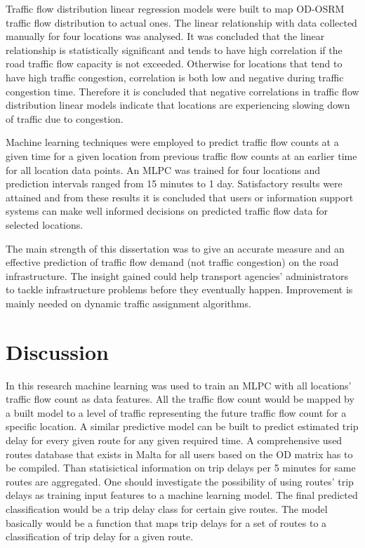 \documentclass[12pt, a4paper]{report}
\theoremstyle{definition}
\theoremstyle{definition}%
\theoremstyle{definition}%
\theoremstyle{definition}%
\theoremstyle{definition}%
\theoremstyle{definition}%
\begin{document}
Traffic flow distribution linear regression models were built to map OD-OSRM traffic flow distribution to actual ones. The linear relationship with data collected manually for four locations was analysed. It was concluded that the linear relationship is statistically significant and tends to have high correlation if the road traffic flow capacity is not exceeded. Otherwise for locations that tend to have high traffic congestion, correlation is both low and negative during traffic congestion time. Therefore it is concluded that negative correlations in traffic flow distribution linear models indicate that locations are experiencing slowing down of traffic due to congestion.

Machine learning techniques were employed to predict traffic flow counts at a given time for a given location from previous traffic flow counts at an earlier time for all location data points. An MLPC was trained for four locations and prediction intervals ranged from 15 minutes to 1 day. Satisfactory results were attained and from these results it is concluded that users or information support systems can make well informed decisions on predicted traffic flow data for selected locations.

The main strength of this dissertation was to give an accurate measure and an effective prediction of traffic flow demand (not traffic congestion) on the road infrastructure. The insight gained could help transport agencies' administrators to tackle infrastructure problems before they eventually happen. Improvement is mainly needed on dynamic traffic assignment algorithms.

\section{Discussion} \label{discussion}

In this research machine learning was used to train an MLPC with all locations' traffic flow count as data features. All the traffic flow count would be mapped by a built model to a level of traffic representing the future traffic flow count for a specific location. A similar predictive model can be built to predict estimated trip delay for every given route for any given required time. A comprehensive used routes database that exists in Malta for all users based on the OD matrix has to be compiled. Than statisictical information on trip delays per 5 minutes for same routes are aggregated. One should investigate the possibility of using routes' trip delays as training input features to a machine learning model. The final predicted classification would be a trip delay class for certain give routes. The model basically would be a function that maps trip delays for a set of routes to a classification of trip delay for a given route.
\end{document}
